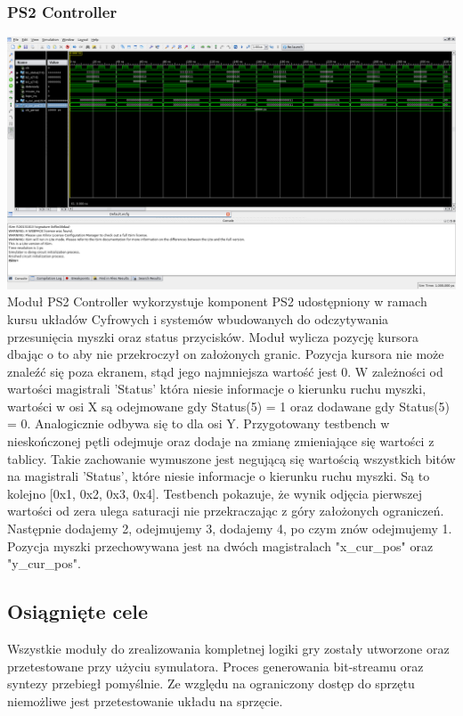 \documentclass[polish,polish,a4paper]{article}
\begin{document}
\subsubsection{PS2 Controller}
\includegraphics[width=16cm]{ps2_tb.png}
\break
Moduł PS2 Controller wykorzystuje komponent PS2 udostępniony w ramach kursu układów 
Cyfrowych i systemów wbudowanych do odczytywania przesunięcia myszki
oraz status przycisków. 
Moduł wylicza pozycję kursora dbając o to aby nie przekroczył on założonych granic. 
Pozycja kursora nie może znaleźć się poza ekranem, stąd jego najmniejsza wartość jest 0.
W zależności od wartości magistrali 'Status' która niesie informacje o kierunku ruchu myszki,
wartości w osi X są odejmowane gdy Status(5) = 1 oraz dodawane gdy Status(5) = 0.
Analogicznie odbywa się to dla osi Y.
Przygotowany testbench w nieskończonej pętli odejmuje oraz dodaje na zmianę zmieniające się wartości z tablicy.
Takie zachowanie wymuszone jest negującą się wartością wszystkich bitów na magistrali 'Status', które niesie informacje o kierunku
ruchu myszki.
Są to kolejno [0x1, 0x2, 0x3, 0x4]. Testbench pokazuje, że wynik odjęcia pierwszej wartości od zera ulega saturacji
nie przekraczając z góry założonych ograniczeń.
Następnie dodajemy 2, odejmujemy 3, dodajemy 4, po czym znów odejmujemy 1.
Pozycja myszki przechowywana jest na dwóch magistralach "x\_cur\_pos" oraz "y\_cur\_pos".

\subsection{Osiągnięte cele}
Wszystkie moduły do zrealizowania kompletnej logiki gry zostały utworzone oraz przetestowane przy użyciu symulatora.
Proces generowania bit-streamu oraz syntezy przebiegł pomyślnie.
Ze względu na ograniczony dostęp do sprzętu niemożliwe jest przetestowanie układu na sprzęcie.
\end{document}
